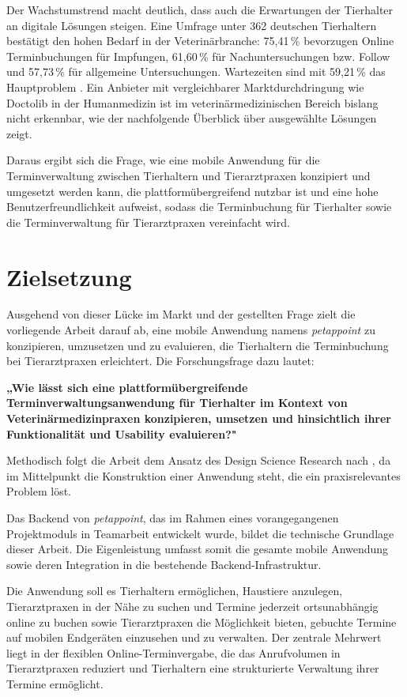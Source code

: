Der Wachstumstrend macht deutlich, dass auch die Erwartungen der Tierhalter an digitale Lösungen steigen. Eine Umfrage unter 362 deutschen Tierhaltern bestätigt den hohen Bedarf in der Veterinärbranche: 75,41\,\% bevorzugen Online Terminbuchungen für Impfungen, 61,60\,\% für Nachuntersuchungen bzw. Follow und 57,73\,\% für allgemeine Untersuchungen. Wartezeiten sind mit 59,21\,\% das Hauptproblem \cite[S.~69]{diez2023}. Ein Anbieter mit vergleichbarer Marktdurchdringung wie Doctolib in der Humanmedizin ist im veterinärmedizinischen Bereich bislang nicht erkennbar, wie der nachfolgende Überblick über ausgewählte Lösungen zeigt.

Daraus ergibt sich die Frage, wie eine mobile Anwendung für die Terminverwaltung zwischen Tierhaltern und Tierarztpraxen konzipiert und umgesetzt werden kann, die plattformübergreifend nutzbar ist und eine hohe Benutzerfreundlichkeit aufweist, sodass die Terminbuchung für Tierhalter sowie die Terminverwaltung für Tierarztpraxen vereinfacht wird.

\section{Zielsetzung}
Ausgehend von dieser Lücke im Markt und der gestellten Frage zielt die vorliegende Arbeit darauf ab, eine mobile Anwendung namens \textit{petappoint} zu konzipieren, umzusetzen und zu evaluieren, die Tierhaltern die Terminbuchung bei Tierarztpraxen erleichtert. Die Forschungsfrage dazu lautet:

\textbf{„Wie lässt sich eine plattformübergreifende Terminverwaltungsanwendung für Tierhalter im Kontext von Veterinärmedizinpraxen konzipieren, umsetzen und hinsichtlich ihrer Funktionalität und Usability evaluieren?"}

Methodisch folgt die Arbeit dem Ansatz des Design Science Research nach \cite{hevner2004}, da im Mittelpunkt die Konstruktion einer Anwendung steht, die ein praxisrelevantes Problem löst.

Das Backend von \textit{petappoint}, das im Rahmen eines vorangegangenen Projektmoduls in Teamarbeit entwickelt wurde, bildet die technische Grundlage dieser Arbeit. Die Eigenleistung umfasst somit die gesamte mobile Anwendung sowie deren Integration in die bestehende Backend-Infrastruktur.

Die Anwendung soll es Tierhaltern ermöglichen, Haustiere anzulegen, Tierarztpraxen in der Nähe zu suchen und Termine jederzeit ortsunabhängig online zu buchen sowie Tierarztpraxen die Möglichkeit bieten, gebuchte Termine auf mobilen Endgeräten einzusehen und zu verwalten. Der zentrale Mehrwert liegt in der flexiblen Online-Terminvergabe, die das Anrufvolumen in Tierarztpraxen reduziert und Tierhaltern eine strukturierte Verwaltung ihrer Termine ermöglicht.

